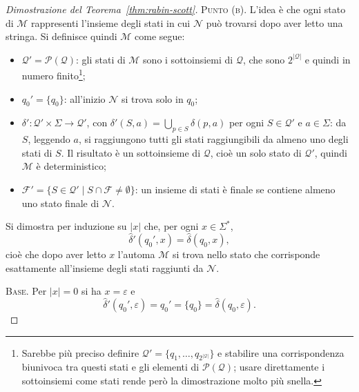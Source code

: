 \documentclass[a4paper, 11pt, oneside]{book}
\theoremstyle{formale}
\begin{document}
\begin{proof}[Dimostrazione del Teorema~\ref{thm:rabin-scott}]
        \textsc{Punto (b)}. L'idea \`e che ogni stato di $\mathcal{M}$ rappresenti
        l'insieme degli stati in cui $\mathcal{N}$ pu\`o trovarsi dopo aver letto una
        stringa. Si definisce quindi $\mathcal{M}$ come segue:
        \begin{itemize}
            \item $\mathcal{Q}' = \mathcal{P}(\mathcal{Q})$: gli stati di $\mathcal{M}$ sono
                i sottoinsiemi di $\mathcal{Q}$, che sono $2^{|\mathcal{Q}|}$ e quindi in
                numero finito\footnote{Sarebbe pi\`u preciso definire
                $\mathcal{Q}' = \{q_1, \dots, q_{2^{|\mathcal{Q}|}}\}$ e stabilire una
                corrispondenza biunivoca tra questi stati e gli elementi di
                $\mathcal{P}(\mathcal{Q})$; usare direttamente i sottoinsiemi come stati
                rende per\`o la dimostrazione molto pi\`u snella.};
            \item $q_0' = \{q_0\}$: all'inizio $\mathcal{N}$ si trova solo in $q_0$;
            \item $\delta' \colon \mathcal{Q}' \times \Sigma \to \mathcal{Q}'$, con
                $\delta'(S, a) = \bigcup_{p \in S} \delta(p, a)$ per ogni
                $S \in \mathcal{Q}'$ e $a \in \Sigma$: da $S$, leggendo $a$, si
                raggiungono tutti gli stati raggiungibili da almeno uno degli stati di $S$.
                Il risultato \`e un sottoinsieme di $\mathcal{Q}$, cio\`e un solo stato di
                $\mathcal{Q}'$, quindi $\mathcal{M}$ \`e deterministico;
            \item $\mathcal{F}' = \{S \in \mathcal{Q}' \mid S \cap \mathcal{F} \neq
                \emptyset\}$: un insieme di stati \`e finale se contiene almeno uno stato
                finale di $\mathcal{N}$.
        \end{itemize}

        Si dimostra per induzione su $|x|$ che, per ogni $x \in \Sigma^*$,
        \begin{equation*}
            \hat{\delta}'(q_0', x) = \hat{\delta}(q_0, x),
        \end{equation*}
        cio\`e che dopo aver letto $x$ l'automa $\mathcal{M}$ si trova nello stato che
        corrisponde esattamente all'insieme degli stati raggiunti da $\mathcal{N}$.

        \textsc{Base}. Per $|x| = 0$ si ha $x = \varepsilon$ e
        \begin{equation*}
            \hat{\delta}'(q_0', \varepsilon) = q_0' = \{q_0\}
            = \hat{\delta}(q_0, \varepsilon).
        \end{equation*}


\end{proof}
\end{document}
